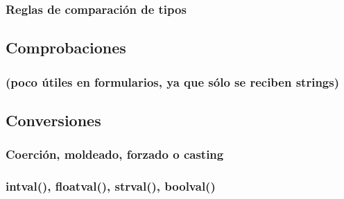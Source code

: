 \documentclass[a4paper,11pt,spanish]{sphinxmanual}
\begin{document}
\subsubsection{Reglas de comparación de tipos}
\label{\detokenize{php:reglas-de-comparacion-de-tipos}}

\subsection{Comprobaciones}
\label{\detokenize{php:comprobaciones}}

\subsubsection{}
\label{\detokenize{php:gettype}}

\subsubsection{ (poco útiles en formularios, ya que sólo se reciben strings)}
\label{\detokenize{php:is-poco-utiles-en-formularios-ya-que-solo-se-reciben-strings}}

\subsubsection{}
\label{\detokenize{php:is-numeric}}

\subsubsection{}
\label{\detokenize{php:ctype}}

\subsection{Conversiones}
\label{\detokenize{php:conversiones}}

\subsubsection{Coerción, moldeado, forzado o casting}
\label{\detokenize{php:coercion-moldeado-forzado-o-casting}}

\subsubsection{intval(), floatval(), strval(), boolval()}
\label{\detokenize{php:intval-floatval-strval-boolval}}
\end{document}
